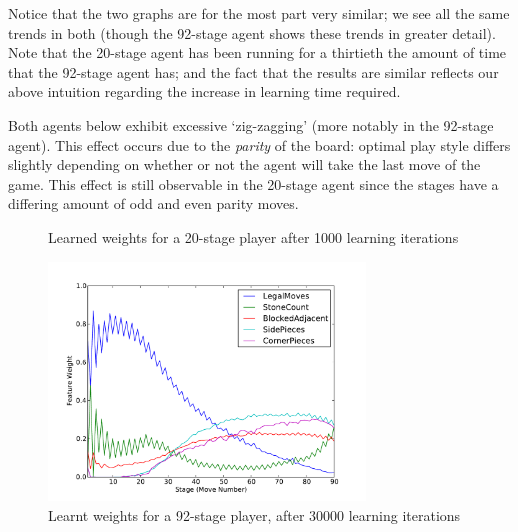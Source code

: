 \documentclass[11pt]{article}
\begin{document}
Notice that the two graphs are for the most part very similar; we see all the
same trends in both (though the 92-stage agent shows these trends in greater
detail). Note that the 20-stage agent has been running for a thirtieth the
amount of time that the 92-stage agent has; and the fact that the results are
similar reflects our above intuition regarding the increase in learning time
required.

Both agents below exhibit excessive `zig-zagging' (more notably in the
92-stage agent). This effect occurs due to the \emph{parity} of the board:
optimal play style differs slightly depending on whether or not the
agent will take the last move of the game. This effect is still observable in
the 20-stage agent since the stages have a differing amount of odd and even
parity moves.

\begin{figure}[htbp]
  \centering
  \caption{Learned weights for a 20-stage player after 1000 learning
    iterations}
  \label{WeightsOverTime}
\end{figure}

\begin{figure}[htbp]
  \centering
  \includegraphics[trim=0cm 0cm 1.5cm 1cm, clip, width=0.75\textwidth]
    {../Graphs/finalweights.pdf}
  \caption{Learnt weights for a 92-stage player, after 30000 learning iterations}
  \label{WeightsOverTime92}
\end{figure}
\end{document}
